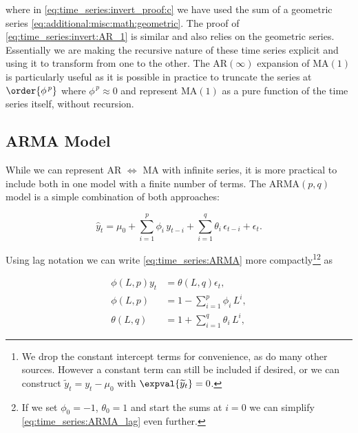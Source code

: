 \noindent where in \cref{eq:time_series:invert_proof:c} we have used
the sum of a geometric series \cref{eq:additional:misc:math:geometric}.
The proof of \cref{eq:time_series:invert:AR_1} is similar and also relies on the geometric series.
Essentially we are making the recursive nature of these time series explicit and using it to transform from one to the other.
The $\text{AR}\left(\infty\right)$ expansion of $\text{MA}\left(1\right)$
is particularly useful as it is possible in practice to truncate the series at $\order{\phi^{\,p}}$
where $\phi^{\,p} \approx 0$ and represent $\text{MA}\left(1\right)$ as
a pure function of the time series itself, \ie without recursion.

\subsection{ARMA Model}
\label{additional:time_series:ARMA}

While we can represent AR $\Leftrightarrow$ MA with infinite series,
it is more practical to include both in one model with a finite number of terms.
The $\text{ARMA}\left(p,q\right)$ model is a simple combination of
both approaches:

\begin{equation}\label{eq:time_series:ARMA}
\hat{y}_{t} = \mu_{0} + \sum_{i=1}^{p} \phi_{i}\, y_{t-i} + \sum_{i=1}^{q} \theta_{i}\, \epsilon_{t-i} + \epsilon_{t}.
\end{equation}

Using lag notation we can write \cref{eq:time_series:ARMA} more
compactly\footnote{We drop
the constant intercept terms for convenience, as do many other sources.
However a constant term can still be included if desired,
or we can construct $\widetilde{y}_{t} = y_{t} - \mu_{0}$ with $\expval{\widetilde{y}_{t}} = 0$.}\footnote{If we set
$\phi_{0}=-1$, $\theta_{0} = 1$ and start the sums at $i=0$
we can simplify \cref{eq:time_series:ARMA_lag} even further.} as

\begin{subequations}\label{eq:time_series:ARMA_lag}
\begin{align}
\phi\left(L,p\right) y_{t} &= \theta\left(L,q\right) \epsilon_{t}, \label{eq:time_series:ARMA_lag:def} \\
\phi\left(L,p\right) &= 1 - \sum_{i=1}^{p} \phi_{i}\, L^{i}, \label{eq:time_series:ARMA_lag:phi} \\
\theta\left(L,q\right) &= 1 + \sum_{i=1}^{q} \theta_{i}\, L^{i}, \label{eq:time_series:ARMA_lag:theta}
\end{align}
\end{subequations}

